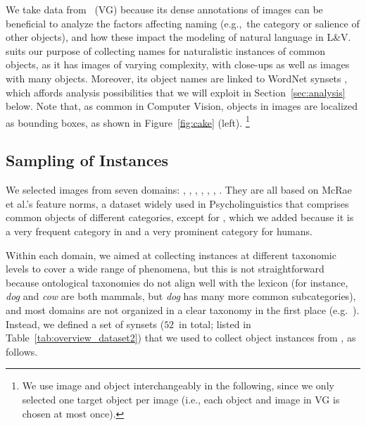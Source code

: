We take data from \vgenome~(VG) because its dense annotations of images can be beneficial to analyze the factors affecting naming (e.g.,\ the category or salience of other objects), and how these impact the modeling of natural language in L\&V.
\vg suits our purpose of collecting names for naturalistic instances of common objects, as it has images of varying complexity, with close-ups as well as images with many objects.
Moreover, its object names are linked to WordNet synsets \cite{fellbaum1998wordnet}, which affords analysis possibilities that we will exploit in Section~\ref{sec:analysis} below.
Note that, as common in Computer Vision, objects in \vg images are localized as bounding boxes, as shown in Figure~\ref{fig:cake} (left).%
\footnote{We use image and object interchangeably in the following, since we only selected one target object per image (i.e., each object and image in VG is chosen at most once).}

\subsection{Sampling of Instances}
\label{ssec:sampling}

We selected images from seven domains: , , , , , , . 
They are all based on McRae et al.'s  \cite{mcrae2005semantic} feature norms, a dataset widely used in Psycholinguistics that comprises common objects of different categories, except for , which we added because it is a very frequent category in \vg and a very prominent category for humans.

Within each domain, we aimed at collecting instances at different taxonomic levels to cover a wide range of phenomena, but this is not straightforward because ontological taxonomies do not align well with the lexicon (for instance, \textit{dog} and \textit{cow} are both mammals, but \textit{dog} has many more common subcategories), and most domains are not organized in a clear taxonomy in the first place (e.g.\ ).
Instead, we defined a set of synsets ($52$\ in total; listed in Table~\ref{tab:overview_dataset2}) that we used to collect object instances from \vg, as follows. 


